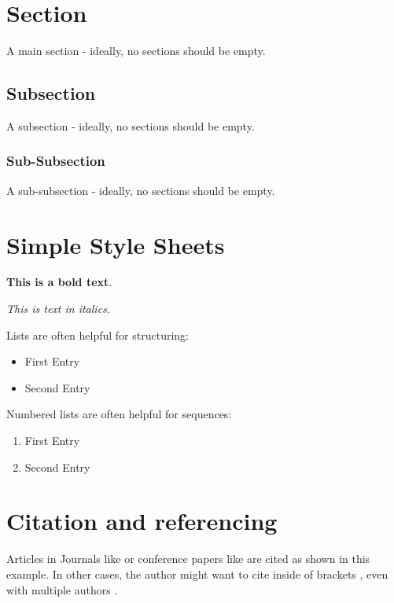 \documentclass[12pt,oneside]{article}
\begin{document}
\clearpage
{}  
    \setcounter{page}{1}
\lhead{\nouppercase{\leftmark}}


\section{Section} \label{Introduction}
A main section - ideally, no sections should be empty.

\subsection{Subsection}
A subsection - ideally, no sections should be empty.

\subsubsection{Sub-Subsection}
A sub-subsection - ideally, no sections should be empty.

\section{Simple Style Sheets}

\textbf{This is a bold text}.

\textit{This is text in italics}.


Lists are often helpful for structuring:
\begin{itemize}
    \item First Entry
    \item Second Entry 
\end{itemize}

Numbered lists are often helpful for sequences:
\begin{enumerate}
    \item First Entry
    \item Second Entry 
\end{enumerate}


\section{Citation and referencing}

Articles in Journals like \citet{clemen1989combining} or conference papers like \citet{he2017mask} are cited as shown in this example. In other cases, the author might want to cite inside of brackets \citep{clemen1989combining}, even with multiple authors \citep{clemen1989combining,baumol1958warehouse,he2017mask}.
\end{document}
